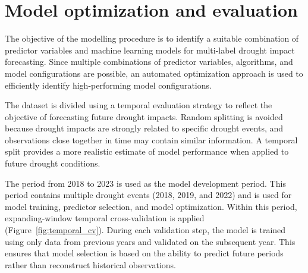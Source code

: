 \section{Model optimization and evaluation}

The objective of the modelling procedure is to identify a suitable combination of predictor variables and machine learning models for multi-label drought impact forecasting. Since multiple combinations of predictor variables, algorithms, and model configurations are possible, an automated optimization approach is used to efficiently identify high-performing model configurations.

The dataset is divided using a temporal evaluation strategy to reflect the objective of forecasting future drought impacts. Random splitting is avoided because drought impacts are strongly related to specific drought events, and observations close together in time may contain similar information. A temporal split provides a more realistic estimate of model performance when applied to future drought conditions.

The period from 2018 to 2023 is used as the model development period. This period contains multiple drought events (2018, 2019, and 2022) and is used for model training, predictor selection, and model optimization. Within this period, expanding-window temporal cross-validation is applied (Figure~\ref{fig:temporal_cv}). During each validation step, the model is trained using only data from previous years and validated on the subsequent year. This ensures that model selection is based on the ability to predict future periods rather than reconstruct historical observations.


